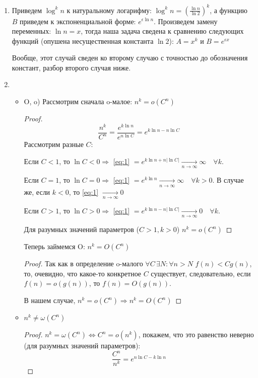 \begin{enumerate}
    \item Приведем $\log^kn$ к натуральному логарифму: $\log^kn=\left(\frac{\ln n}{\ln 2}\right)^k$, а функцию $B$ приведем к экспоненциальной форме: $e^{\epsilon\ln n}$. Произведем замену переменных: $\ln n = x$, тогда наша задача сведена к сравнению следующих функций (опушена несущественная константа $\ln 2$): $A=x^k$ и $B=e^{\epsilon x}$
    \begin{remark}
        Вообще, этот случай сведен ко второму случаю с точностью до обозначения констант, разбор второго случая ниже.
    \end{remark}
    \item 
    \begin{itemize}
        \item O, o) Рассмотрим сначала o-малое: $n^k=o(C^n)$
        \begin{proof}
            \begin{equation}
            \label{eq:1}
                \frac{n^k}{C^n} = \frac{e^{k\ln n}}{e^{n\ln C}} = e^{k\ln n - n\ln C}
            \end{equation}
            Рассмотрим разные $C$:

            Если $C<1$, то $\ln C < 0 \Longrightarrow$ \eqref{eq:1} $ = e^{k\ln n + n |\ln C|} \xrightarrow[n\to\infty]{} \infty \quad \forall k$.
            
            Если $C=1$, то $\ln C = 0 \Longrightarrow$ \eqref{eq:1} $= e^{k\ln n} \xrightarrow[n\to\infty]{} \infty \quad \forall k > 0$.
            В случае же, если $k<0$, то \eqref{eq:1} $\xrightarrow[n\to\infty]{} 0$
            
            Если $C>1$, то $\ln C > 0 \Longrightarrow$ \eqref{eq:1} $= e^{k\ln n - n|\ln C|} \xrightarrow[n\to\infty]{} 0 \quad \forall k$.
            
            Для разумных значений параметров ($C>1,k>0$) $n^k=o(C^n)$
        \end{proof}

        Теперь займемся O: $n^k = O(C^n)$
        \begin{proof}
            \label{proof:O}
            Так как в определение o-малого $\forall C\,\exists N:\forall n>N \,\, f(n)<Cg(n)$, то, очевидно, что какое-то конкретное $C$ существует, следовательно, если $f(n)=o(g(n))$, то $f(n)=O(g(n))$.

            В нашем случае, $n^k=o(C^n) \Longrightarrow n^k=O(C^n)$
        \end{proof}
        \item $n^k\neq\omega(C^n)$
        \begin{proof}
            $n^k=\omega(C^n)\Leftrightarrow C^n = o(n^k)$, покажем, что это равенство неверно (для разумных значений параметров):
            \begin{equation}
                \label{eq:2}
                \frac{C^n}{n^k} = e^{n\ln C - k\ln n}
            \end{equation}
            

\end{proof}
\end{itemize}
\end{enumerate}

